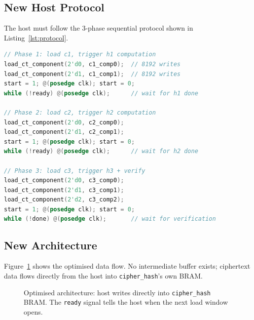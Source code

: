 \documentclass[12pt, a4paper]{article}
\begin{document}
\subsection{New Host Protocol}

The host must follow the 3-phase sequential protocol shown in
Listing~\ref{lst:protocol}.

\begin{lstlisting}[language=Verilog,
  caption={3-phase load protocol (from \texttt{tb\_hash\_verifier.v}).},
  label={lst:protocol}]
// Phase 1: load c1, trigger h1 computation
load_ct_component(2'd0, c1_comp0);  // 8192 writes
load_ct_component(2'd1, c1_comp1);  // 8192 writes
start = 1; @(posedge clk); start = 0;
while (!ready) @(posedge clk);      // wait for h1 done

// Phase 2: load c2, trigger h2 computation
load_ct_component(2'd0, c2_comp0);
load_ct_component(2'd1, c2_comp1);
start = 1; @(posedge clk); start = 0;
while (!ready) @(posedge clk);      // wait for h2 done

// Phase 3: load c3, trigger h3 + verify
load_ct_component(2'd0, c3_comp0);
load_ct_component(2'd1, c3_comp1);
load_ct_component(2'd2, c3_comp2);
start = 1; @(posedge clk); start = 0;
while (!done) @(posedge clk);       // wait for verification
\end{lstlisting}

\subsection{New Architecture}

Figure~\ref{fig:new_arch} shows the optimised data flow. No
intermediate buffer exists; ciphertext data flows directly from the
host into \texttt{cipher\_hash}'s own BRAM.

\begin{figure}[h]
\centering
{}
\caption{Optimised architecture: host writes directly into
\texttt{cipher\_hash} BRAM. The \texttt{ready} signal tells the host
when the next load window opens.}
\label{fig:new_arch}
\end{figure}
\end{document}

